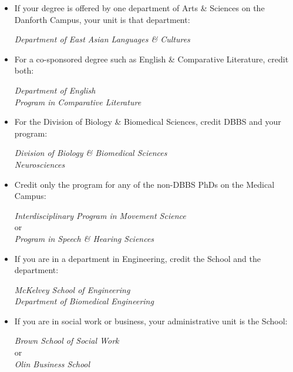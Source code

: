\begin{itemize}[$\circ$]
\zerotrivseps   %
\item If your degree is offered by one department of Arts \& Sciences on the Danforth Campus, your unit is that department:
    \begin{center}
        \emph{Department of East Asian Languages \& Cultures}
    \end{center}

\item For a co-sponsored degree such as English \& Comparative Literature, credit both:
    \begin{center}
        \emph{Department of English}\\
        \emph{Program in Comparative Literature}
    \end{center}

\item For the Division of Biology \& Biomedical Sciences, credit DBBS and your program:
    \begin{center}
        \emph{Division of Biology \& Biomedical Sciences}\\
        \emph{Neurosciences}
    \end{center}

\item Credit only the program for any of the non-DBBS PhDs on the Medical Campus:
    \begin{center}
        \emph{Interdisciplinary Program in Movement Science}\\
        or\\
        \emph{Program in Speech \& Hearing Sciences}
    \end{center}

\pagebreak
\item If you are in a department in Engineering, credit the School and the department:
    \begin{center}
        \emph{McKelvey School of Engineering}\\
        \emph{Department of Biomedical Engineering}
    \end{center}

\item If you are in social work or business, your administrative unit is the School:
    \begin{center}
        \emph{Brown School of Social Work}\\
        or\\
        \emph{Olin Business School}
    \end{center}

\restoretrivseps
\end{itemize}

